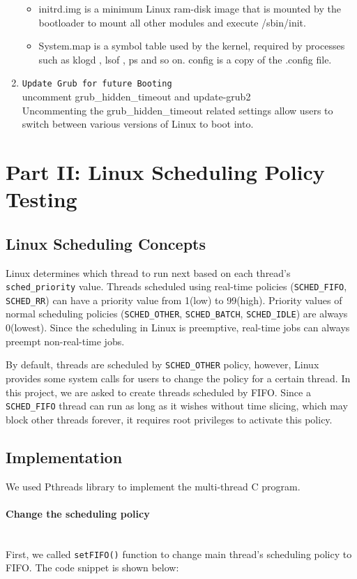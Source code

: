 \documentclass[12pt]{article}
\begin{document}
\begin{enumerate}
\begin{itemize}
	\item initrd.img  is a minimum Linux ram-disk image that is mounted by the bootloader to mount all other modules and execute /sbin/init.

	\item System.map is a symbol table used by the kernel, required by processes such as klogd , lsof , ps and so on.
	config is a copy of the .config file.
	\end{itemize}


\item \verb|Update Grub for future Booting|\\
	uncomment grub\_hidden\_timeout and update-grub2\\
	Uncommenting the grub\_hidden\_timeout related settings allow users to switch between various versions of Linux to boot into.
\end{enumerate}
\newpage
\section{Part II: Linux Scheduling Policy Testing}
\subsection*{Linux Scheduling Concepts}
	Linux determines which thread to run next based on each thread's \verb|sched_priority| value. Threads scheduled using real-time policies (\verb|SCHED_FIFO|, \verb|SCHED_RR|) can have a priority value from 1(low) to 99(high). Priority values of normal scheduling policies (\verb|SCHED_OTHER|, \verb|SCHED_BATCH|, \verb|SCHED_IDLE|) are always 0(lowest). Since the scheduling in Linux is preemptive, real-time jobs can always preempt non-real-time jobs.
	
	By default, threads are scheduled by \verb|SCHED_OTHER| policy, however, Linux provides some system calls for users to change the policy for a certain thread. In this project, we are asked to create threads scheduled by FIFO. Since a \verb|SCHED_FIFO| thread can run as long as it wishes without time slicing, which may block other threads forever, it requires root privileges to activate this policy.
	
\subsection*{Implementation}
	We used Pthreads library to implement the multi-thread C program.
\paragraph{Change the scheduling policy}\mbox{}\\
First, we called \verb|setFIFO()| function to change main thread's scheduling policy to FIFO. The code snippet is shown below:
	
\end{document}
